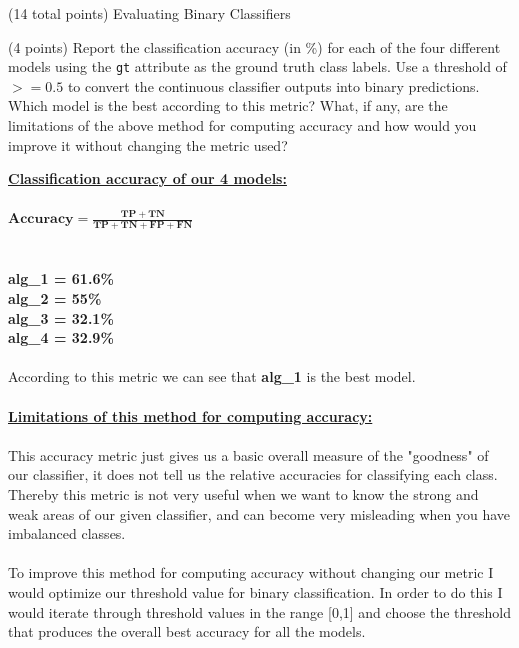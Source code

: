 \documentclass[12pt]{article}
\begin{document}
\begin{question}{(14 total points) Evaluating Binary Classifiers}





%
%
\begin{subquestion}{(4 points) Report the classification accuracy (in \%) for each of the four different models using the \texttt{gt} attribute as the ground truth class labels. 
Use a threshold of $>= 0.5$ to convert the continuous classifier outputs into binary predictions. 
Which model is the best according to this metric?
What, if any, are the limitations of the above method for computing accuracy and how would you improve it without changing the metric used?
}


\begin{answerbox}{32em}
\large{\textbf{\underline{Classification accuracy of our 4 models:}}}\\
\\
\normalsize{
$\mathbf{Accuracy = \frac{TP+TN}{TP+TN+FP+FN}}$\\
\\
\\
\textbf{alg\_1 = \textcolor{OliveGreen}{61.6\%}}
\\
\textbf{alg\_2 = 55\%}
\\
\textbf{alg\_3 = 32.1\%}
\\
\textbf{alg\_4 = 32.9\%}
\\
\\
According to this metric we can see that \textbf{alg\_1} is the best model.\\
\\
\textbf{\underline{Limitations of this method for computing accuracy:}}\\
\\
This accuracy metric just gives us a basic overall measure of the "goodness" of our classifier, it does not tell us the relative accuracies for classifying each class. Thereby this metric is not very useful when we want to know the strong and weak areas of our given classifier, and can become very misleading when you have imbalanced classes.\\
\\
To improve this method for computing accuracy without changing our metric I would optimize our threshold value for binary classification. In order to do this I would iterate through threshold values in the range [0,1] and choose the threshold that produces the overall best accuracy for all the models.
}
\end{answerbox}




\end{subquestion}
\end{question}
\end{document}
